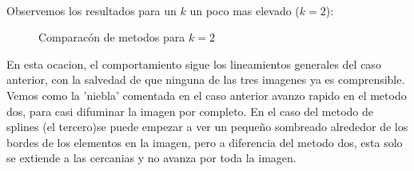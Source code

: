 \\
Observemos los resultados para un $k$ un poco mas elevado ($k=2$):

\begin{figure}[H]
    \centering
    \qquad
    \qquad
    \caption{Comparacón de metodos para $k = 2$}%
    \label{fig:example}%
\end{figure}

En esta ocacion, el comportamiento sigue los lineamientos generales del caso anterior, con la salvedad de que ninguna de las tres imagenes ya es comprensible. Vemos como la 'niebla' comentada en el caso anterior avanzo rapido en el metodo dos, para casi difuminar la imagen por completo. En el caso del metodo de splines (el tercero)se puede empezar a ver un pequeño sombreado alrededor de los bordes de los elementos en la imagen, pero a diferencia del metodo dos, esta solo se extiende a las cercanias y no avanza por toda la imagen.

